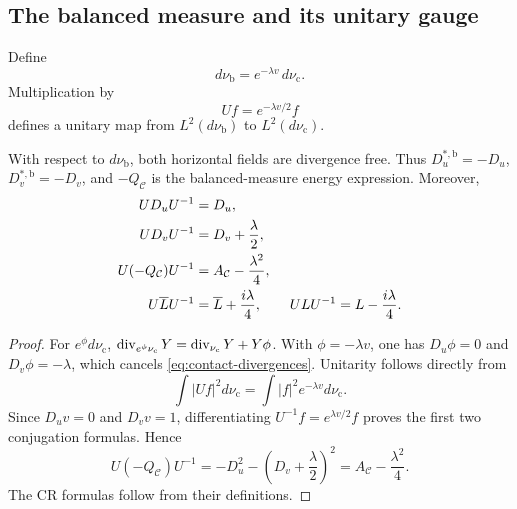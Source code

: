 \subsection{The balanced measure and its unitary gauge}

\begin{definition}\label{def:contact-balanced-measure}
Define
\begin{equation}\label{eq:contact-balanced-measure}
 d\nu_{\mathrm b}=e^{-\lambda v}\,d\nu_{\mathrm c}.
\end{equation}
Multiplication by
\begin{equation}\label{eq:contact-measure-unitary}
 Uf=e^{-\lambda v/2}f
\end{equation}
defines a unitary map from $L^2(d\nu_{\mathrm b})$ to
$L^2(d\nu_{\mathrm c})$.
\end{definition}

\begin{proposition}
\label{prop:contact-two-measure-gauge}
With respect to $d\nu_{\mathrm b}$, both horizontal fields are divergence free.
Thus $D_u^{*,\mathrm b}=-D_u$, $D_v^{*,\mathrm b}=-D_v$, and
$-Q_{\mathcal C}$ is the balanced-measure energy expression.  Moreover,
\begin{align}
 U D_uU^{-1}&=D_u,\label{eq:gauge-Du}\\
 U D_vU^{-1}&=D_v+\frac{\lambda}{2},\label{eq:gauge-Dv}\\
 U(-Q_{\mathcal C})U^{-1}
   &=A_{\mathcal C}-\frac{\lambda^2}{4},\label{eq:gauge-sum-squares}\\
 U\overline L U^{-1}&=\overline L+\frac{i\lambda}{4},\qquad
 UL U^{-1}=L-\frac{i\lambda}{4}.\label{eq:gauge-cr}
\end{align}
\end{proposition}

\begin{proof}
For $e^\phi d\nu_{\mathrm c}$,
$\operatorname{div}_{e^\phi\nu_{\mathrm c}}Y=\operatorname{div}_{\nu_{\mathrm c}}Y+Y\phi$.
With $\phi=-\lambda v$, one has $D_u\phi=0$ and $D_v\phi=-\lambda$,
which cancels \eqref{eq:contact-divergences}.  Unitarity follows directly from
\[
 \int|Uf|^2d\nu_{\mathrm c}
 =\int|f|^2e^{-\lambda v}d\nu_{\mathrm c}.
\]
Since $D_uv=0$ and $D_vv=1$, differentiating
$U^{-1}f=e^{\lambda v/2}f$ proves the first two conjugation formulas.  Hence
\[
 U(-Q_{\mathcal C})U^{-1}
 =-D_u^2-\left(D_v+\frac{\lambda}{2}\right)^2
 =A_{\mathcal C}-\frac{\lambda^2}{4}.
\]
The CR formulas follow from their definitions.
\end{proof}

